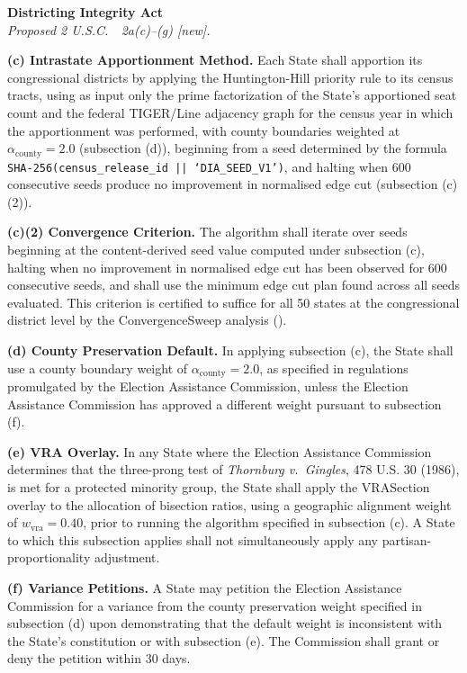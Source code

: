 \begin{statute}
\noindent\textbf{Districting Integrity Act}\\
\textit{Proposed 2 U.S.C.\ \usca{}\ 2a(c)--(g) [new].}

\medskip
\noindent\textbf{(c) Intrastate Apportionment Method.}
Each State shall apportion its congressional districts by applying the
Huntington-Hill priority rule to its census tracts, using as input only
the prime factorization of the State's apportioned seat count and the
federal TIGER/Line adjacency graph for the census year in which the
apportionment was performed, with county boundaries weighted at
$\alpha_\text{county} = 2.0$ (subsection (d)), beginning from a seed
determined by the formula \texttt{SHA-256(census\_release\_id || `DIA\_SEED\_V1')},
and halting when 600 consecutive seeds produce no improvement in normalised
edge cut (subsection (c)(2)).

\medskip
\noindent\textbf{(c)(2) Convergence Criterion.}
The algorithm shall iterate over seeds beginning at the content-derived
seed value computed under subsection (c), halting when no improvement in
normalised edge cut has been observed for 600 consecutive seeds, and shall
use the minimum edge cut plan found across all seeds evaluated.
This criterion is certified to suffice for all 50 states at the congressional
district level by the ConvergenceSweep analysis (\citealt{b16paper}).

\medskip
\noindent\textbf{(d) County Preservation Default.}
In applying subsection (c), the State shall use a county boundary weight
of $\alpha_\text{county} = 2.0$, as specified in regulations promulgated by
the Election Assistance Commission, unless the Election Assistance Commission
has approved a different weight pursuant to subsection (f).

\medskip
\noindent\textbf{(e) VRA Overlay.}
In any State where the Election Assistance Commission determines that the
three-prong test of \textit{Thornburg v.\ Gingles}, 478 U.S. 30 (1986),
is met for a protected minority group, the State shall apply the
VRASection overlay to the allocation of bisection ratios, using a geographic
alignment weight of $w_\text{vra} = 0.40$, prior to running the algorithm
specified in subsection (c).
A State to which this subsection applies shall not simultaneously apply any
partisan-proportionality adjustment.

\medskip
\noindent\textbf{(f) Variance Petitions.}
A State may petition the Election Assistance Commission for a variance from
the county preservation weight specified in subsection (d) upon demonstrating
that the default weight is inconsistent with the State's constitution or
with subsection (e).
The Commission shall grant or deny the petition within 30 days.


\end{statute}

